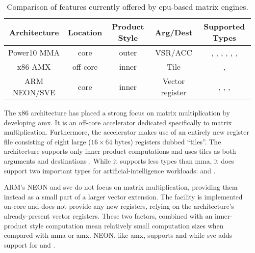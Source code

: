\documentclass[\main/thesis.tex]{subfiles}
\begin{document}
\begin{table}
  \centering
  \begin{tabular}{| c | c | c | c | c |}
    \hline
    Architecture & Location & \parbox[t][28pt][t]{40pt}{\centering Product Style} & Arg/Dest & Supported Types\\\hline
    \parbox[t][][t]{40pt}{\centering Power10 MMA} & core & outer & VSR/ACC & \parbox[t][40pt][t]{3.2cm}{\raggedright{}, , , , , , }\\\hline
    x86 AMX & off-core & inner & Tile &\parbox[t][11pt][t]{3.3cm}{\raggedright{}, }\\\hline
    \parbox[t][][t]{60pt}{\centering ARM NEON/SVE} & core & inner & Vector register & \parbox[t][25pt][t]{3.3cm}{\raggedright{}, , , }\\\hline
  \end{tabular}
  \caption[Matrix Engine Feature Comparison]{Comparison of features currently offered by cpu-based matrix engines.}
  \label{tab:featComp}
\end{table}

The x86 architecture has placed a strong focus on matrix multiplication by developing \gls{amx}.
It is an off-core accelerator dedicated specifically to matrix multiplication.
Furthermore, the accelerator makes use of an entirely new register file consisting of eight large ($16 \times 64$ bytes) registers dubbed ``tiles''.
The architecture supports only inner product computations and uses tiles as both arguments and destinations .
While it supports less types than \gls{mma}, it does support two important types for artificial-intelligence workloads:  and .

ARM's NEON and \gls{sve} do not focus on matrix multiplication, providing them instead as a small part of a larger vector extension.
The facility is implemented on-core and does not provide any new registers, relying on the architecture's already-present vector registers.
These two factors, combined with an inner-product style computation mean relatively small computation sizes when compared with \gls{mma} or \gls{amx}.
NEON, like \gls{amx}, supports  and  while \gls{sve} adds support for  and .
\end{document}
